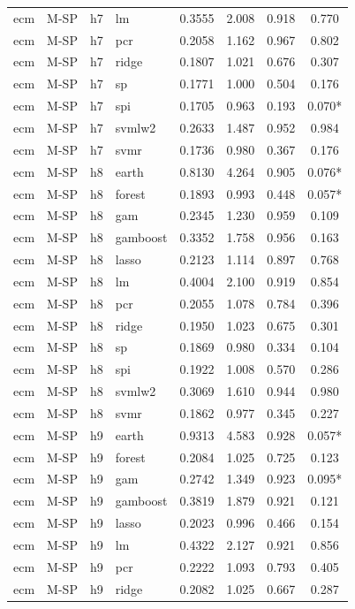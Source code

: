 \begin{ThreePartTable}
\begin{longtable}[t]{llclcccc}
ecm & M-SP & h7 & lm & 0.3555 & 2.008 & 0.918 & 0.770\\
ecm & M-SP & h7 & pcr & 0.2058 & 1.162 & 0.967 & 0.802\\
ecm & M-SP & h7 & ridge & 0.1807 & 1.021 & 0.676 & 0.307\\
ecm & M-SP & h7 & sp & 0.1771 & 1.000 & 0.504 & 0.176\\
ecm & M-SP & h7 & spi & 0.1705 & 0.963 & 0.193 & 0.070*\\
ecm & M-SP & h7 & svmlw2 & 0.2633 & 1.487 & 0.952 & 0.984\\
ecm & M-SP & h7 & svmr & 0.1736 & 0.980 & 0.367 & 0.176\\
\addlinespace
ecm & M-SP & h8 & earth & 0.8130 & 4.264 & 0.905 & 0.076*\\
ecm & M-SP & h8 & forest & 0.1893 & 0.993 & 0.448 & 0.057*\\
ecm & M-SP & h8 & gam & 0.2345 & 1.230 & 0.959 & 0.109\\
ecm & M-SP & h8 & gamboost & 0.3352 & 1.758 & 0.956 & 0.163\\
ecm & M-SP & h8 & lasso & 0.2123 & 1.114 & 0.897 & 0.768\\
ecm & M-SP & h8 & lm & 0.4004 & 2.100 & 0.919 & 0.854\\
ecm & M-SP & h8 & pcr & 0.2055 & 1.078 & 0.784 & 0.396\\
ecm & M-SP & h8 & ridge & 0.1950 & 1.023 & 0.675 & 0.301\\
ecm & M-SP & h8 & sp & 0.1869 & 0.980 & 0.334 & 0.104\\
ecm & M-SP & h8 & spi & 0.1922 & 1.008 & 0.570 & 0.286\\
ecm & M-SP & h8 & svmlw2 & 0.3069 & 1.610 & 0.944 & 0.980\\
ecm & M-SP & h8 & svmr & 0.1862 & 0.977 & 0.345 & 0.227\\
\addlinespace
ecm & M-SP & h9 & earth & 0.9313 & 4.583 & 0.928 & 0.057*\\
ecm & M-SP & h9 & forest & 0.2084 & 1.025 & 0.725 & 0.123\\
ecm & M-SP & h9 & gam & 0.2742 & 1.349 & 0.923 & 0.095*\\
ecm & M-SP & h9 & gamboost & 0.3819 & 1.879 & 0.921 & 0.121\\
ecm & M-SP & h9 & lasso & 0.2023 & 0.996 & 0.466 & 0.154\\
ecm & M-SP & h9 & lm & 0.4322 & 2.127 & 0.921 & 0.856\\
ecm & M-SP & h9 & pcr & 0.2222 & 1.093 & 0.793 & 0.405\\
ecm & M-SP & h9 & ridge & 0.2082 & 1.025 & 0.667 & 0.287\\

\end{longtable}
\end{ThreePartTable}
